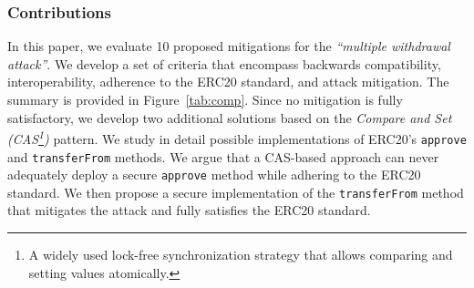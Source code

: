 \subsubsection*{Contributions} In this paper, we evaluate 10 proposed mitigations for the \textit{``multiple withdrawal attack''}. We develop a set of criteria that encompass backwards compatibility, interoperability, adherence to the ERC20 standard, and attack mitigation. The summary is provided in Figure~\ref{tab:comp}. Since no mitigation is fully satisfactory, we develop two additional solutions based on the \textit{Compare and Set (CAS\footnote{A widely used lock-free synchronization strategy that allows comparing and setting values atomically.})} pattern\cite{Ref06}. We study in detail possible implementations of ERC20's \texttt{approve} and \texttt{transferFrom} methods. We argue that a CAS-based approach can never adequately deploy a secure \texttt{approve} method while adhering to the ERC20 standard. We then propose a secure implementation of the \texttt{transferFrom} method that mitigates the attack and fully satisfies the ERC20 standard. 


